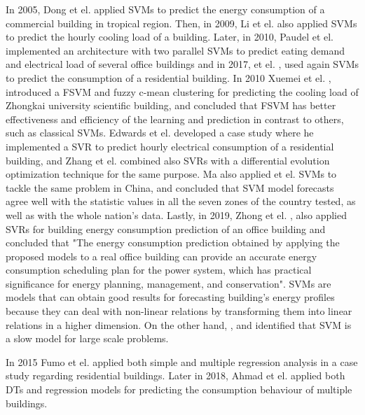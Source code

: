 In 2005, Dong et el. \cite{svm2} applied \ac{SVM}s to predict the energy consumption of a commercial building in tropical region. Then, in 2009, Li et el. \cite{svmr1} also applied \ac{SVM}s to predict the hourly cooling load of a building. Later, in 2010, Paudel et el. \cite{svm3} implemented an architecture with two parallel \ac{SVM}s to predict eating demand and electrical load of several office buildings and in 2017, et el. \cite{svmr7}, used again \ac{SVM}s to predict the consumption of a residential building. In 2010 Xuemei et el. \cite{svmr2}, introduced a \ac{FSVM} and fuzzy c-mean clustering for predicting the cooling load of Zhongkai university scientific building, and concluded that \ac{FSVM} has better effectiveness and efficiency of the learning and prediction in contrast to others, such as classical \ac{SVM}s. Edwards et el. \cite{svmr3} developed a case study where he implemented a \ac{SVR} to predict hourly electrical consumption of a residential building, and Zhang et el. \cite{svmr4} combined also \ac{SVR}s with a differential evolution optimization technique for the same purpose. Ma also applied et el. \cite{svmr5} \ac{SVM}s to tackle the same problem in China, and concluded that \ac{SVM} model forecasts agree well with the statistic values in all the seven zones of the country tested, as well as with the whole nation's data. Lastly, in 2019, Zhong et el. \cite{svmr6}, also applied \ac{SVR}s for building energy consumption prediction of an office building and concluded that "The energy consumption prediction obtained by applying the proposed models to a real office building can provide an accurate energy consumption scheduling plan for the power system, which has practical significance for energy planning, management, and conservation". \ac{SVM}s are models that can obtain good results for forecasting building's energy profiles because they can deal with non-linear relations by transforming them into linear relations in a higher dimension. On the other hand, \cite{svm3}, \cite{svm2} and \cite{svm5} identified that \ac{SVM} is a slow model for large scale problems.
 
In 2015 Fumo et el. \cite{regression0} applied both simple and multiple regression analysis in a case study regarding residential buildings. Later in 2018, Ahmad et el. \cite{dt0} applied both DTs and regression models for predicting the consumption behaviour of multiple buildings.

